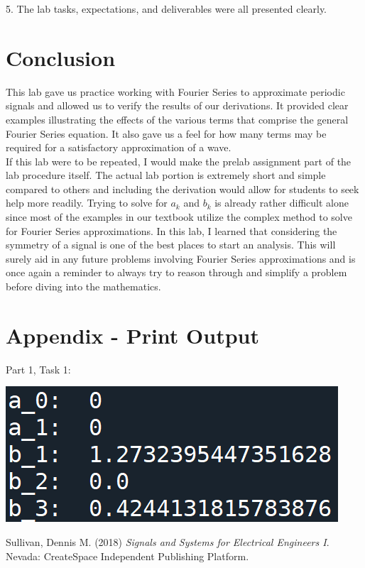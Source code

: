 \documentclass[12pt]{report}
\begin{document}
5. The lab tasks, expectations, and deliverables were all presented clearly.

\section{Conclusion}

This lab gave us practice working with Fourier Series to approximate periodic signals and allowed us to verify the results of our derivations. It provided clear examples illustrating the effects of the various terms that comprise the general Fourier Series equation. It also gave us a feel for how many terms may be required for a satisfactory approximation of a wave. \\

If this lab were to be repeated, I would make the prelab assignment part of the lab procedure itself. The actual lab portion is extremely short and simple compared to others and including the derivation would allow for students to seek help more readily. Trying to solve for $ a_k $ and $ b_k $ is already rather difficult alone since most of the examples in our textbook utilize the complex method to solve for Fourier Series approximations. In this lab, I learned that considering the symmetry of a signal is one of the best places to start an analysis. This will surely aid in any future problems involving Fourier Series approximations and is once again a reminder to always try to reason through and simplify a problem before diving into the mathematics. \\ 

\newpage
\appendix
\section*{Appendix - Print Output}

Part 1, Task 1:
\begin{center}
	\includegraphics[scale = 0.8]{Lab 8 - Print Output/Part1-Task1.png}\\[1.0 cm]
\end{center}

\newpage
\begin{thebibliography}{111}
	
	Sullivan, Dennis M. (2018) {\it  Signals and Systems for Electrical Engineers I}. Nevada: CreateSpace Independent Publishing Platform.
	
\end{thebibliography}
\end{document}
